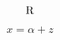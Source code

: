 \documentclass{article}
\begin{document}
\[
\color[rgb]{0.000,0.000,0.000} {
\text{R}}
\]


\begin{equation}
x = \alpha + z
\end{equation}
\end{document}
